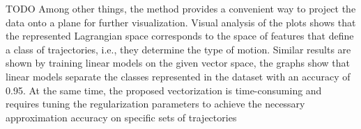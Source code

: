 \documentclass[12pt]{paper}
\begin{document}
TODO Among other things, the method provides a convenient way to project the data onto a plane for further visualization. Visual analysis of the plots shows that the represented Lagrangian space corresponds to the space of features that define a class of trajectories, i.e., they determine the type of motion. Similar results are shown by training linear models on the given vector space, the graphs show that linear models separate the classes represented in the dataset with an accuracy of 0.95. At the same time, the proposed vectorization is time-consuming and requires tuning the regularization parameters to achieve the necessary approximation accuracy on specific sets of trajectories
\begin{thebibliography}{99}



\end{thebibliography}
\end{document}
